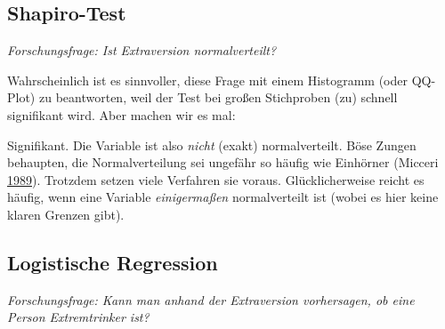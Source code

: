 \documentclass[12pt,ngerman,]{book}
\makeatletter
\newenvironment{Shaded}{\begin{snugshade}}{\end{snugshade}}
\newcommand{\KeywordTok}[1]{\textcolor[rgb]{0.13,0.29,0.53}{\textbf{#1}}}
\newcommand{\DataTypeTok}[1]{\textcolor[rgb]{0.13,0.29,0.53}{#1}}
\newcommand{\StringTok}[1]{\textcolor[rgb]{0.31,0.60,0.02}{#1}}
\newcommand{\CommentTok}[1]{\textcolor[rgb]{0.56,0.35,0.01}{\textit{#1}}}
\newcommand{\OperatorTok}[1]{\textcolor[rgb]{0.81,0.36,0.00}{\textbf{#1}}}
\newcommand{\NormalTok}[1]{#1}
\newenvironment{kframe}{%
\medskip{}
\setlength{\fboxsep}{.8em}
 \def\at@end@of@kframe{}%
 \ifinner\ifhmode%
  \def\at@end@of@kframe{\end{minipage}}%
  \begin{minipage}{\columnwidth}%
 \fi\fi%
 \def\FrameCommand##1{\hskip\@totalleftmargin \hskip-\fboxsep
 \colorbox{shadecolor}{##1}\hskip-\fboxsep
     \hskip-\linewidth \hskip-\@totalleftmargin \hskip\columnwidth}%
 \MakeFramed {\advance\hsize-\width
   \@totalleftmargin\z@ \linewidth\hsize
   \@setminipage}}%
 {\par\unskip\endMakeFramed%
 \at@end@of@kframe}
\renewenvironment{Shaded}{\begin{kframe}}{\end{kframe}}
\theoremstyle{definition}
\theoremstyle{definition}
\theoremstyle{remark}
\makeatother
\begin{document}
\subsection{Shapiro-Test}\label{shapiro-test}

\emph{Forschungsfrage: Ist Extraversion normalverteilt?}

Wahrscheinlich ist es sinnvoller, diese Frage mit einem Histogramm (oder
QQ-Plot) zu beantworten, weil der Test bei großen Stichproben (zu)
schnell signifikant wird. Aber machen wir es mal:

\begin{Shaded}
\end{Shaded}

Signifikant. Die Variable ist also \emph{nicht} (exakt) normalverteilt.
Böse Zungen behaupten, die Normalverteilung sei ungefähr so häufig wie
Einhörner (Micceri \protect\hyperlink{ref-Micceri1989}{1989}). Trotzdem
setzen viele Verfahren sie voraus. Glücklicherweise reicht es häufig,
wenn eine Variable \emph{einigermaßen} normalverteilt ist (wobei es hier
keine klaren Grenzen gibt).

\subsection{Logistische Regression}\label{logistische-regression}

\emph{Forschungsfrage: Kann man anhand der Extraversion vorhersagen, ob
eine Person Extremtrinker ist?}

\begin{Shaded}
\end{Shaded}
\end{document}
